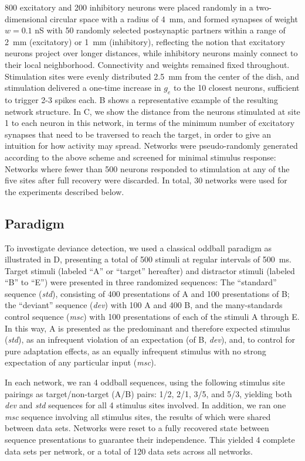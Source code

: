 \documentclass[9pt,lineno,onehalfspacing]{elife}
\newcommand{\dev}{\textit{dev}}
\newcommand{\msc}{\textit{msc}}
\newcommand{\std}{\textit{std}}
\begin{document}
800 excitatory and 200 inhibitory neurons were placed randomly in a two-dimensional circular space with a radius of 4~mm, and formed synapses of weight $w = 0.1$ nS with 50 randomly selected postsynaptic partners within a range of 2~mm (excitatory) or 1~mm (inhibitory), reflecting the notion that excitatory neurons project over longer distances, while inhibitory neurons mainly connect to their local neighborhood. Connectivity and weights remained fixed throughout. Stimulation sites were evenly distributed 2.5~mm from the center of the dish, and stimulation delivered a one-time increase in $g_e$ to the 10 closest neurons, sufficient to trigger 2-3 spikes each. B shows a representative example of the resulting network structure. In C, we show the distance from the neurons stimulated at site 1 to each neuron in this network, in terms of the minimum number of excitatory synapses that need to be traversed to reach the target, in order to give an intuition for how activity may spread. Networks were pseudo-randomly generated according to the above scheme and screened for minimal stimulus response: Networks where fewer than 500 neurons responded to stimulation at any of the five sites after full recovery were discarded. In total, 30 networks were used for the experiments described below.

\subsection{Paradigm}\label{sec:paradigm}

To investigate deviance detection, we used a classical oddball paradigm as illustrated in D, presenting a total of 500 stimuli at regular intervals of 500~ms. Target stimuli (labeled ``A'' or ``target'' hereafter) and distractor stimuli (labeled ``B'' to ``E'') were presented in three randomized sequences: The ``standard'' sequence (\std{}), consisting of 400 presentations of A and 100 presentations of B; the ``deviant'' sequence (\dev{}) with 100 A and 400 B, and the many-standards control sequence (\msc{}) with 100 presentations of each of the stimuli A through E. In this way, A is presented as the predominant and therefore expected stimulus (\std{}), as an infrequent violation of an expectation (of B, \dev{}), and, to control for pure adaptation effects, as an equally infrequent stimulus with no strong expectation of any particular input (\msc{}).

In each network, we ran 4 oddball sequences, using the following stimulus site pairings as target/non-target (A/B) pairs: 1/2, 2/1, 3/5, and 5/3, yielding both \dev{} and \std{} sequences for all 4 stimulus sites involved. In addition, we ran one \msc{} sequence involving all stimulus sites, the results of which were shared between data sets. Networks were reset to a fully recovered state between sequence presentations to guarantee their independence. This yielded 4 complete data sets per network, or a total of 120 data sets across all networks.
\end{document}
